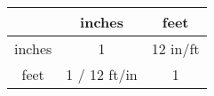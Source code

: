 \begin{tabular}{| c | c | c |}
  \hline
  & inches & feet \\
  \hline
  inches & 1 & 12 \si{in/ft}\\
  \hline
  feet & 1 / 12 \si{ft/in} & 1 \\
  \hline
\end{tabular}
